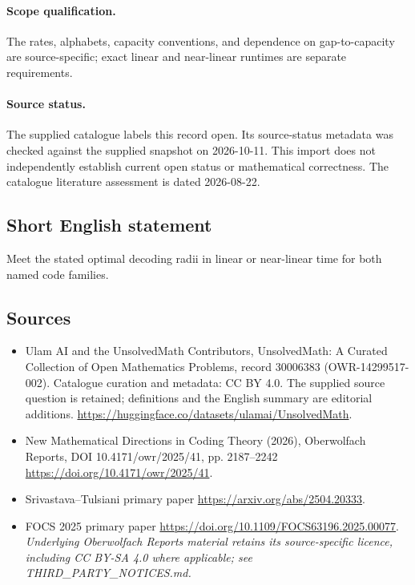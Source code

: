 \documentclass[11pt]{article}
\begin{document}
\paragraph{Scope qualification.}
The rates, alphabets, capacity conventions, and dependence on gap-to-capacity are source-specific; exact linear and near-linear runtimes are separate requirements.
\paragraph{Source status.}
The supplied catalogue labels this record open. Its source-status metadata was checked against the supplied snapshot on 2026-10-11. This import does not independently establish current open status or mathematical correctness. The catalogue literature assessment is dated 2026-08-22.
\subsection{Short English statement}
Meet the stated optimal decoding radii in linear or near-linear time for both named code families.
\subsection{Sources}
\begin{itemize}
\item[S1] Ulam AI and the UnsolvedMath Contributors, UnsolvedMath: A Curated Collection of Open Mathematics Problems, record 30006383 (OWR-14299517-002). Catalogue curation and metadata: CC BY 4.0. The supplied source question is retained; definitions and the English summary are editorial additions.
\url{https://huggingface.co/datasets/ulamai/UnsolvedMath}.
\item[S2] New Mathematical Directions in Coding Theory (2026), Oberwolfach Reports, DOI 10.4171/owr/2025/41, pp. 2187--2242
\url{https://doi.org/10.4171/owr/2025/41}.
\item[S3] Srivastava--Tulsiani primary paper
\url{https://arxiv.org/abs/2504.20333}.
\item[S4] FOCS 2025 primary paper
\url{https://doi.org/10.1109/FOCS63196.2025.00077}.
\textit{Underlying Oberwolfach Reports material retains its source-specific licence, including CC BY-SA 4.0 where applicable; see THIRD\_PARTY\_NOTICES.md.}
\end{itemize}
\end{document}
